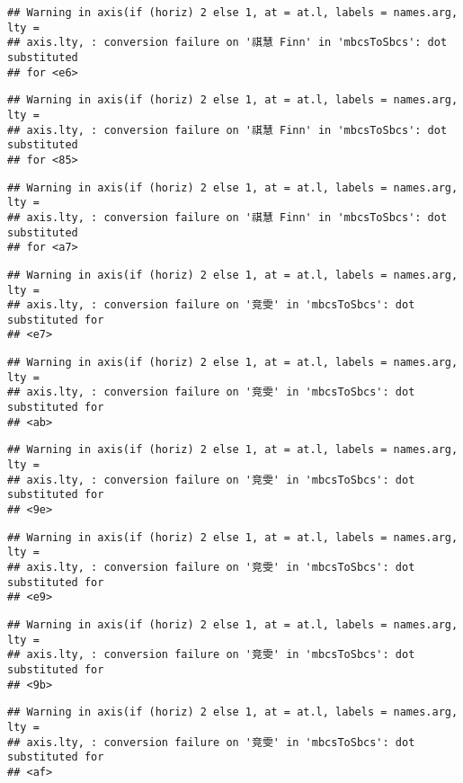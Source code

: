 \documentclass[
]{article}
\begin{document}
\begin{verbatim}
## Warning in axis(if (horiz) 2 else 1, at = at.l, labels = names.arg, lty =
## axis.lty, : conversion failure on '祺慧 Finn' in 'mbcsToSbcs': dot substituted
## for <e6>
\end{verbatim}

\begin{verbatim}
## Warning in axis(if (horiz) 2 else 1, at = at.l, labels = names.arg, lty =
## axis.lty, : conversion failure on '祺慧 Finn' in 'mbcsToSbcs': dot substituted
## for <85>
\end{verbatim}

\begin{verbatim}
## Warning in axis(if (horiz) 2 else 1, at = at.l, labels = names.arg, lty =
## axis.lty, : conversion failure on '祺慧 Finn' in 'mbcsToSbcs': dot substituted
## for <a7>
\end{verbatim}

\begin{verbatim}
## Warning in axis(if (horiz) 2 else 1, at = at.l, labels = names.arg, lty =
## axis.lty, : conversion failure on '竞雯' in 'mbcsToSbcs': dot substituted for
## <e7>
\end{verbatim}

\begin{verbatim}
## Warning in axis(if (horiz) 2 else 1, at = at.l, labels = names.arg, lty =
## axis.lty, : conversion failure on '竞雯' in 'mbcsToSbcs': dot substituted for
## <ab>
\end{verbatim}

\begin{verbatim}
## Warning in axis(if (horiz) 2 else 1, at = at.l, labels = names.arg, lty =
## axis.lty, : conversion failure on '竞雯' in 'mbcsToSbcs': dot substituted for
## <9e>
\end{verbatim}

\begin{verbatim}
## Warning in axis(if (horiz) 2 else 1, at = at.l, labels = names.arg, lty =
## axis.lty, : conversion failure on '竞雯' in 'mbcsToSbcs': dot substituted for
## <e9>
\end{verbatim}

\begin{verbatim}
## Warning in axis(if (horiz) 2 else 1, at = at.l, labels = names.arg, lty =
## axis.lty, : conversion failure on '竞雯' in 'mbcsToSbcs': dot substituted for
## <9b>
\end{verbatim}

\begin{verbatim}
## Warning in axis(if (horiz) 2 else 1, at = at.l, labels = names.arg, lty =
## axis.lty, : conversion failure on '竞雯' in 'mbcsToSbcs': dot substituted for
## <af>
\end{verbatim}
\end{document}
